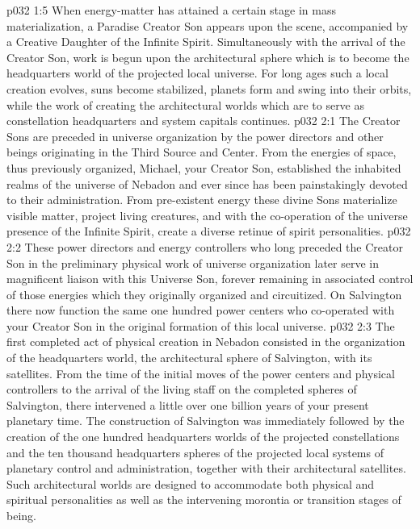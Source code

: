 \vs p032 1:5 \pc When energy\hyp{}matter has attained a certain stage in mass materialization, a Paradise Creator Son appears upon the scene, accompanied by a Creative Daughter of the Infinite Spirit. Simultaneously with the arrival of the Creator Son, work is begun upon the architectural sphere which is to become the headquarters world of the projected local universe. For long ages such a local creation evolves, suns become stabilized, planets form and swing into their orbits, while the work of creating the architectural worlds which are to serve as constellation headquarters and system capitals continues.
\vs p032 2:1 The Creator Sons are preceded in universe organization by the power directors and other beings originating in the Third Source and Center. From the energies of space, thus previously organized, Michael, your Creator Son, established the inhabited realms of the universe of Nebadon and ever since has been painstakingly devoted to their administration. From pre\hyp{}existent energy these divine Sons materialize visible matter, project living creatures, and with the co\hyp{}operation of the universe presence of the Infinite Spirit, create a diverse retinue of spirit personalities.
\vs p032 2:2 These power directors and energy controllers who long preceded the Creator Son in the preliminary physical work of universe organization later serve in magnificent liaison with this Universe Son, forever remaining in associated control of those energies which they originally organized and circuitized. On Salvington there now function the same one hundred power centers who co\hyp{}operated with your Creator Son in the original formation of this local universe.
\vs p032 2:3 \pc The first completed act of physical creation in Nebadon consisted in the organization of the headquarters world, the architectural sphere of Salvington, with its satellites. From the time of the initial moves of the power centers and physical controllers to the arrival of the living staff on the completed spheres of Salvington, there intervened a little over one billion years of your present planetary time. The construction of Salvington was immediately followed by the creation of the one hundred headquarters worlds of the projected constellations and the ten thousand headquarters spheres of the projected local systems of planetary control and administration, together with their architectural satellites. Such architectural worlds are designed to accommodate both physical and spiritual personalities as well as the intervening morontia or transition stages of being.
